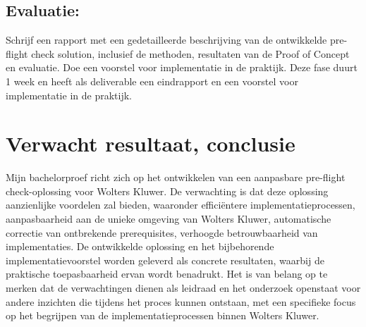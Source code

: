 \subsection{Evaluatie:}
Schrijf een rapport met een gedetailleerde beschrijving van de ontwikkelde pre-flight check solution, inclusief de methoden, resultaten van de Proof of Concept en evaluatie. Doe een voorstel voor implementatie in de praktijk. Deze fase duurt 1 week en heeft als deliverable een eindrapport en een voorstel voor implementatie in de praktijk.


\section{Verwacht resultaat, conclusie}%
\label{sec:verwachte_resultaten}

Mijn bachelorproef richt zich op het ontwikkelen van een aanpasbare pre-flight check-oplossing voor Wolters Kluwer. De verwachting is dat deze oplossing aanzienlijke voordelen zal bieden, waaronder efficiëntere implementatieprocessen, aanpasbaarheid aan de unieke omgeving van Wolters Kluwer, automatische correctie van ontbrekende prerequisites, verhoogde betrouwbaarheid van implementaties. De ontwikkelde oplossing en het bijbehorende implementatievoorstel worden geleverd als concrete resultaten, waarbij de praktische toepasbaarheid ervan wordt benadrukt. Het is van belang op te merken dat de verwachtingen dienen als leidraad en het onderzoek openstaat voor andere inzichten die tijdens het proces kunnen ontstaan, met een specifieke focus op het begrijpen van de implementatieprocessen binnen Wolters Kluwer.


